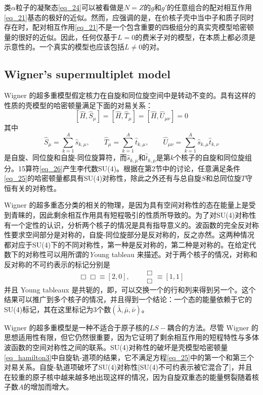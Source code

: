 类$\alpha$粒子的凝聚态\ref{eq_24}可以被看做是$N=Z$的$g$和$g'$的任意组合的配对相互作用\ref{eq_21}基态的极好的近似。然而，应强调的是，在价核子壳中当中子和质子同时存在时，配对相互作用\ref{eq_21}不是一个包含重要的四极组分的真实壳模型哈密顿量的很好的近似。因此，任何仅基于$L=0$的费米子对的模型，在本质上都必须是示意性的。一个真实的模型也应该包括$L\ne0$的对。

\subsection{Wigner's supermultiplet model}

Wigner 的超多重模型假定核力在自旋和同位旋空间中是转动不变的。具有这样的性质的壳模型的哈密顿量满足下面的对易关系：
\begin{equation}\label{eq_25}
[\hat{H},\hat{S}_\mu]=[\hat{H},\hat{T}_\mu]=[\hat{H},\hat{U}_{\mu\nu}]=0
\end{equation}
其中
\begin{equation}\label{eq_26}
\hat{S}_\mu=\sum_{k=1}^A\hat{s}_{k,\mu},\qquad\hat{T}_\mu=\sum_{k=1}^A\hat{t}_{k,\mu},\qquad\hat{U}_{\mu\nu}=\sum_{k=1}^A\hat{s}_{k,\mu}\hat{t}_{k,\nu}
\end{equation}
是自旋、同位旋和自旋-同位旋算符，而$\hat{s}_{k,\mu}$和$\hat{t}_{k,\mu}$是第$k$个核子的自旋和同位旋组分。15算符\ref{eq_26}产生李代数SU(4)。根据在第2节中的讨论，任意满足条件\ref{eq_25}的哈密顿量都具有SU(4)对称性，除此之外还有与总自旋$S$和总同位旋$T$守恒有关的对称性。

Wigner 的超多重态分类的相关的物理，是因为具有空间对称性的态在能量上是受到青睐的，因此剩余相互作用具有短程吸引的性质所导致的。为了对SU(4)对称性有一个定性的认识，分析两个核子的情况是具有指导意义的。波函数的完全反对称性要求空间部分是对称的，自旋-同位旋部分是反对称的，反之亦然。这两种情况都对应于SU(4)下的不同对称性，第一种是反对称的，第二种是对称的。在给定代数下的对称性可以用所谓的{\emph Young tableau} 来描述。对于两个核子的情况，对称和反对称的不可约表示的标记分别是
\begin{equation*}
\Box\Box\equiv[2,0],\qquad\begin{array}{c}
\Box\\[-2.5ex]
\Box
\end{array}\equiv[1,1]
\end{equation*}
并且 Young tableaux 是共轭的，即，可以交换一个的行和列来得到另一个。这个结果可以推广到多个核子的情况，并且得到一个结论：一个态的能量依赖于它的SU(4)标记，其在这里标记为3个数$(\bar{\lambda},\bar{\mu},\bar{\nu})$。

Wigner 的超多重模型是一种不适合于原子核的$LS-$耦合的方法。尽管 Wigner 的思想适用性有限，但它仍然很重要，因为它证明了剩余相互作用的短程特性与多体波函数的空间对称性之间的联系。SU(4)对称性的破坏是壳模型哈密顿量\ref{eq_hamilton3}中自旋轨-道项的结果，它不满足方程\ref{eq_25}中的第一个和第三个对易关系。自旋-轨道项破坏了SU(4)对称性[SU(4)不可约表示被它混合了]，并且在较重的原子核中越来越多地出现这样的情况，因为自旋双重态的能量劈裂随着核子数$A$的增加而增大。

